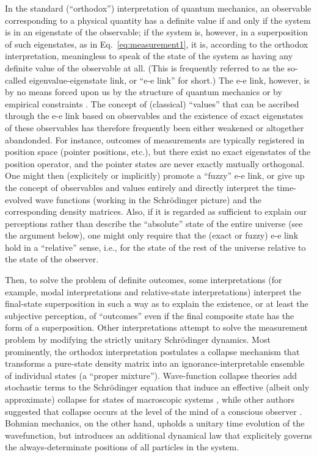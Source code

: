 \documentclass[twocolumn,rmp,aps,amsmath,amsfonts,noshowkeys,noshowpacs]{revtex4}
\begin{document}
In the standard (``orthodox'') interpretation of quantum mechanics, an
observable corresponding to a physical quantity has a definite value
if and only if the system is in an eigenstate of the observable; if
the system is, however, in a superposition of such eigenstates, as in
Eq.~\eqref{eq:measurement1}, it is, according to the orthodox
interpretation, meaningless to speak of the state of the system
as having any definite value of the observable at all.  (This is
frequently referred to as the so-called eigenvalue-eigenstate
link, or ``{e-e} link'' for short.) The {e-e} link, however, is by
no means forced upon us by the structure of quantum mechanics or by
empirical constraints \citep{Bub:1997:iq}.  The concept of (classical)
``values'' that can be ascribed through the e-e link based on
observables and the existence of exact eigenstates of these
observables has therefore frequently been either weakened or
altogether abandonded.  For instance, outcomes of measurements are
typically registered in position space (pointer positions, etc.), but
there exist no exact eigenstates of the position operator, and the
pointer states are never exactly mutually orthogonal. One might then
(explicitely or implicitly) promote a ``fuzzy'' e-e link, or give up
the concept of observables and values entirely and directly interpret
the time-evolved wave functions (working in the Schr\"odinger picture)
and the corresponding density matrices.  Also, if it is regarded as
sufficient to explain our perceptions rather than describe the
``absolute'' state of the entire universe (see the argument below),
one might only require that the (exact or fuzzy) e-e link hold in a
``relative'' sense, i.e., for the state of the rest of the universe
relative to the state of the observer.

Then, to solve the problem of definite outcomes, some interpretations
(for example, modal interpretations and relative-state
interpretations) interpret the final-state superposition in such a way
as to explain the existence, or at least the subjective perception, of
``outcomes'' even if the final composite state has the form of a
superposition. Other interpretations attempt to solve the measurement
problem by modifying the strictly unitary Schr\"odinger dynamics. Most
prominently, the orthodox interpretation postulates a collapse
mechanism that transforms a pure-state density matrix into an
ignorance-interpretable ensemble of individual states (a ``proper
mixture'').  Wave-function collapse theories add stochastic terms to
the Schr\"odinger equation that induce an effective (albeit only
approximate) collapse for states of macroscopic systems
\citep{Pearle:1979:rq,Gisin:1984:qs,Ghirardi:1986:ud,Pearle:1999:cr},
while other authors suggested that collapse occurs at the level of the
mind of a conscious observer \citep{Wigner:1963:yt,Stapp:1993:mm}.
Bohmian mechanics, on the other hand, upholds a unitary time evolution
of the wavefunction, but introduces an additional dynamical law that
explicitely governs the always-determinate positions of all particles
in the system.
\end{document}
